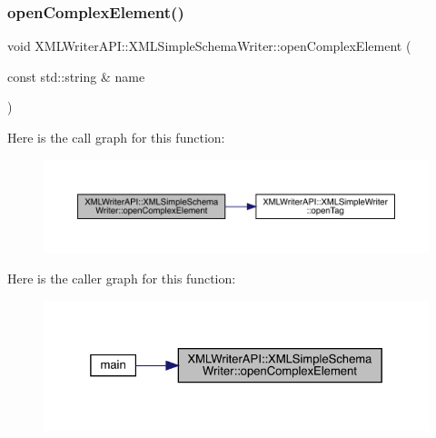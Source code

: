 \subsubsection{\texorpdfstring{openComplexElement()}{openComplexElement()}\hspace{0.1cm}{\footnotesize\ttfamily [2/2]}}
{\footnotesize\ttfamily void X\+M\+L\+Writer\+A\+P\+I\+::\+X\+M\+L\+Simple\+Schema\+Writer\+::open\+Complex\+Element (\begin{DoxyParamCaption}\item[{const std\+::string \&}]{name }\end{DoxyParamCaption})\hspace{0.3cm}{\ttfamily [inline]}}

Here is the call graph for this function\+:
\nopagebreak
\begin{figure}[H]
\begin{center}
\leavevmode
\includegraphics[width=350pt]{db/d0b/classXMLWriterAPI_1_1XMLSimpleSchemaWriter_a136a57c1860b0baa0fd6b877f4dce4bc_cgraph}
\end{center}
\end{figure}
Here is the caller graph for this function\+:\nopagebreak
\begin{figure}[H]
\begin{center}
\leavevmode
\includegraphics[width=325pt]{db/d0b/classXMLWriterAPI_1_1XMLSimpleSchemaWriter_a136a57c1860b0baa0fd6b877f4dce4bc_icgraph}
\end{center}
\end{figure}
\mbox{\label{classXMLWriterAPI_1_1XMLSimpleSchemaWriter_a312669330ac26b8849f671ea23ea60de}} 
